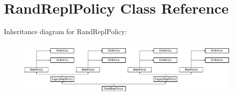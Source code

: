 \hypertarget{classRandReplPolicy}{\section{Rand\-Repl\-Policy Class Reference}
\label{classRandReplPolicy}
}
Inheritance diagram for Rand\-Repl\-Policy\-:\begin{figure}[H]
\begin{center}
\leavevmode
\includegraphics[height=2.868853cm]{classRandReplPolicy}
\end{center}
\end{figure}
